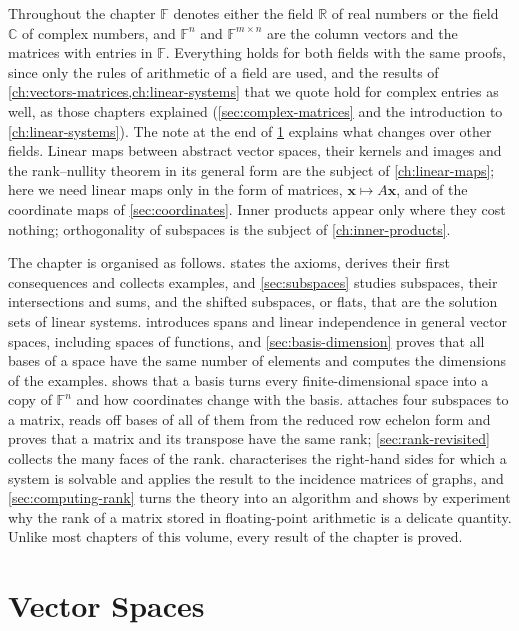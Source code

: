 Throughout the chapter $\mathbb F$ denotes either the field $\mathbb R$ of real numbers or the field $\mathbb C$ of complex numbers, and $\mathbb F^n$ and $\mathbb F^{m\times n}$ are the column vectors and the matrices with entries in $\mathbb F$. Everything holds for both fields with the same proofs, since only the rules of arithmetic of a field are used, and the results of \cref{ch:vectors-matrices,ch:linear-systems} that we quote hold for complex entries as well, as those chapters explained (\cref{sec:complex-matrices} and the introduction to \cref{ch:linear-systems}). The note at the end of \cref{sec:vector-spaces} explains what changes over other fields. Linear maps between abstract vector spaces, their kernels and images and the rank--nullity theorem in its general form are the subject of \cref{ch:linear-maps}; here we need linear maps only in the form of matrices, $\mathbf x\mapsto A\mathbf x$, and of the coordinate maps of \cref{sec:coordinates}. Inner products appear only where they cost nothing; orthogonality of subspaces is the subject of \cref{ch:inner-products}.

The chapter is organised as follows.  states the axioms, derives their first consequences and collects examples, and \cref{sec:subspaces} studies subspaces, their intersections and sums, and the shifted subspaces, or flats, that are the solution sets of linear systems.  introduces spans and linear independence in general vector spaces, including spaces of functions, and \cref{sec:basis-dimension} proves that all bases of a space have the same number of elements and computes the dimensions of the examples.  shows that a basis turns every finite-dimensional space into a copy of $\mathbb F^n$ and how coordinates change with the basis.  attaches four subspaces to a matrix, reads off bases of all of them from the reduced row echelon form and proves that a matrix and its transpose have the same rank; \cref{sec:rank-revisited} collects the many faces of the rank.  characterises the right-hand sides for which a system is solvable and applies the result to the incidence matrices of graphs, and \cref{sec:computing-rank} turns the theory into an algorithm and shows by experiment why the rank of a matrix stored in floating-point arithmetic is a delicate quantity. Unlike most chapters of this volume, every result of the chapter is proved.

\section{Vector Spaces}
\label{sec:vector-spaces}

